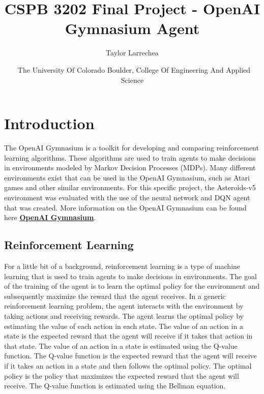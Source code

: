 \documentclass[
	a4paper, %
	10pt, %
	unnumberedsections, %
	twoside, %
]{LTJournalArticle}
\title{CSPB 3202 Final Project - OpenAI Gymnasium Agent\\} %
\author{%
	Taylor Larrechea
}
\date{\footnotesize\ The University Of Colorado Boulder, College Of Engineering And Applied Science}
\begin{document}
\maketitle %


\section{Introduction}

The OpenAI Gymnasium is a toolkit for developing and comparing reinforcement learning algorithms. These algorithms are used to train agents to make decisions in environments modeled by Markov Decision 
Processes (MDPs). Many different environments exist that can be used in the OpenAI Gymnasium, such as Atari games and other similar environments. For this specific project, the Asteroids-v5 environment
was evaluated with the use of the neural network and DQN agent that was created. More information on the OpenAI Gymnasium can be found here \href{https://gymnasium.farama.org/content/basic_usage/}{\textbf{OpenAI Gymnasium}}.

\subsection{Reinforcement Learning}

For a little bit of a background, reinforcement learning is a type of machine learning that is used to train agents to make decisions in environments. The goal of the training of the agent is to learn
the optimal policy for the environment and subsequently maximize the reward that the agent receives. In a generic reinforcement learning problem, the agent interacts with the environment by taking actions
and receiving rewards. The agent learns the optimal policy by estimating the value of each action in each state. The value of an action in a state is the expected reward that the agent will receive if it
takes that action in that state. The value of an action in a state is estimated using the Q-value function. The Q-value function is the expected reward that the agent will receive if it takes an action in a
state and then follows the optimal policy. The optimal policy is the policy that maximizes the expected reward that the agent will receive. The Q-value function is estimated using the Bellman equation.
\end{document}
